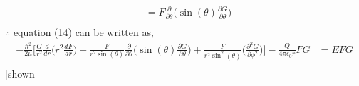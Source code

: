 \documentclass{article}
\begin{document}
{\begin{align*}
    &= F\frac{\partial}{\partial \theta}\Big(\sin(\theta)\frac{\partial G}{\partial \theta}\Big)\\
\end{align*}
$\therefore$ equation (14) can be written as,
\begin{align*}
    -\frac{\hbar^2}{2\mu}\Big[\frac{G}{r^2}\frac{d}{dr}\Big(r^2\frac{dF}{d r}\Big)+\frac{F}{r^2\sin(\theta)}\frac{\partial}{\partial \theta}\Big(\sin(\theta)\frac{\partial G}{\partial \theta}\Big)+\frac{F}{r^2\sin^2(\theta)}\Big(\frac{\partial^2G}{\partial \phi^2}\Big)\Big]-\frac{Q}{4\pi \epsilon_0r}FG &= EFG\\
\end{align*}
\hspace{15cm}[shown]
}

\vspace{4cm}

\subsection{}%
\end{document}
